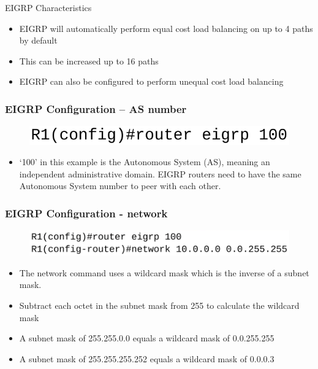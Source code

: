 \documentclass[pdflatex,compress,mathserif]{beamer}
\begin{document}
\begin{frame}{EIGRP Characteristics}
	\begin{itemize}
		\item EIGRP will automatically perform equal cost load balancing on
up to 4 paths by default
		\item This can be increased up to 16 paths
		\item EIGRP can also be configured to perform unequal cost load
balancing
	\end{itemize}
\end{frame}

\begin{frame}
	\frametitle{EIGRP Configuration – AS number}
	\begin{figure}
		\centering
		\includegraphics[width=0.6\linewidth]{img/img10}
	\end{figure}
	\begin{itemize}
		\item ‘100’ in this example is the Autonomous System (AS), meaning
an independent administrative domain. EIGRP routers need to
have the same Autonomous System number to peer with each
other.
	\end{itemize}
\end{frame}

\begin{frame}
	\frametitle{EIGRP Configuration - network}
	\begin{figure}
		\centering
		\includegraphics[width=\linewidth]{img/img11}
	\end{figure}
	\begin{itemize}
		\item The network command uses a wildcard mask which is the inverse of a
subnet mask.
		\item Subtract each octet in the subnet mask from 255 to calculate the
wildcard mask
		\item A subnet mask of 255.255.0.0 equals a wildcard mask of 0.0.255.255
		\item A subnet mask of 255.255.255.252 equals a wildcard mask of 0.0.0.3
	\end{itemize}
\end{frame}
\end{document}
